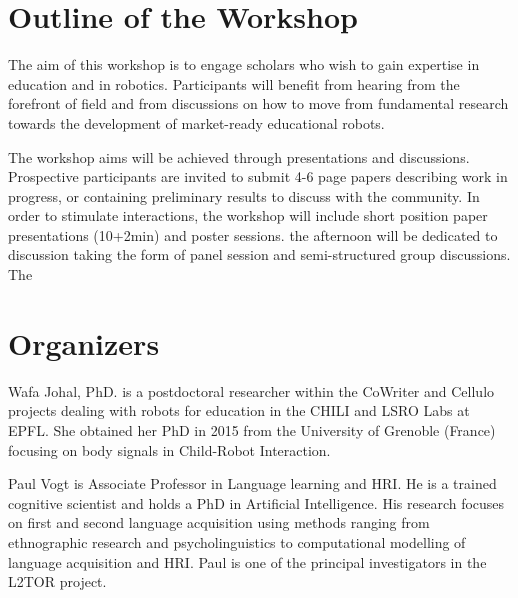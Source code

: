 \documentclass{sig-alternate-05-2015}
\begin{document}

\section{Outline of the Workshop}
The aim of this workshop is to engage scholars who wish to gain expertise in 
education and in robotics. Participants will benefit from hearing from the 
forefront of field and from discussions on how to move from fundamental research 
towards the development of market-ready educational robots.

The workshop aims will be achieved through presentations and discussions. 
Prospective participants are invited to submit 4-6 page papers describing work in progress, or containing preliminary results to discuss with the community.
In order to stimulate interactions, the workshop will include short position paper presentations (10+2min) and poster sessions. 
the afternoon will be dedicated to discussion taking the form of panel session and semi-structured group discussions. 
The 

\section{Organizers}
Wafa Johal, PhD.  is a postdoctoral researcher within the CoWriter and Cellulo projects dealing with robots for education in the CHILI and LSRO Labs at EPFL. She obtained her PhD in 2015 from the University of Grenoble (France) focusing on body signals in Child-Robot Interaction.  

Paul Vogt is Associate Professor in Language learning and HRI. He is a trained cognitive scientist and holds a PhD in Artificial Intelligence. His research focuses on first and second language acquisition using methods ranging from ethnographic research and psycholinguistics to computational modelling of language acquisition and HRI. Paul is one of the principal investigators in the L2TOR project.
\end{document}

